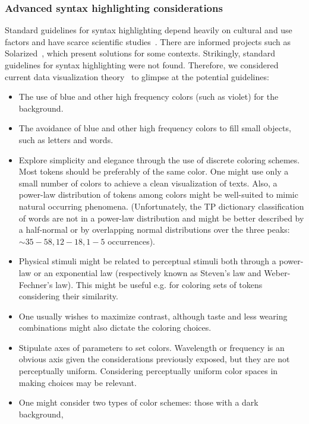 
\subsubsection{Advanced syntax highlighting considerations}
Standard guidelines for syntax highlighting
depend heavily on cultural and use factors
and have scarce scientific studies~\cite{stack}.
There are informed projects such as Solarized~\cite{solarized},
which present solutions for some contexts.
Strikingly, standard guidelines for syntax highlighting were not found.
Therefore, we considered current data visualization
theory~\cite{dv1,dv2,dv3,dv4} to glimpse at the potential guidelines:
\begin{itemize}
  \item The use of blue and other high frequency colors (such as
    violet) for the background.
  \item The avoidance of blue and other high frequency
  colors to fill small objects, such as letters and words.
  \item Explore simplicity and elegance through the use of discrete
  coloring schemes. Most tokens should be preferably of
  the same color.
    One might use only a small number of colors to achieve a clean
    visualization of texts.
  Also, a power-law distribution of tokens among colors might be
    well-suited to mimic natural occurring phenomena.
    (Unfortunately, the TP dictionary classification of words are not in a
    power-law distribution and might be better described by a half-normal or by
overlapping normal distributions over the three peaks: $\sim35-58,
12-18, 1-5$ occurrences).
  \item Physical stimuli might be related to perceptual stimuli both 
    through a power-law or an exponential law (respectively known
    as Steven's law and Weber-Fechner's law).
    This might be useful e.g. for coloring sets of tokens
    considering their similarity.
  \item One usually wishes to maximize contrast,
  although taste and less wearing combinations might
  also dictate the coloring choices.
  \item Stipulate axes of parameters to set colors.
  Wavelength or frequency is an obvious axis given the considerations
    previously exposed, but they are not perceptually uniform.
    Considering perceptually uniform color spaces in making
    choices may be relevant.
  \item One might consider two types of color schemes: those with a dark background,

\end{itemize}
